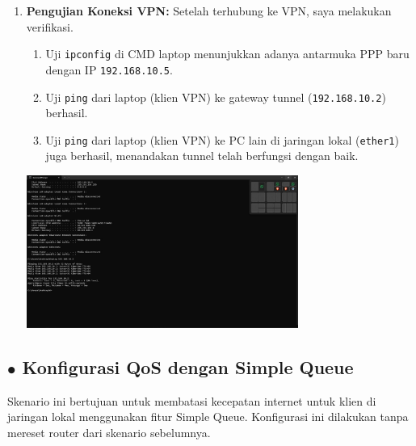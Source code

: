 \begin{enumerate}
    \item \textbf{Pengujian Koneksi VPN:} Setelah terhubung ke VPN, saya melakukan verifikasi.
    \begin{enumerate}[label*=\alph*.]
        \item Uji \texttt{ipconfig} di CMD laptop menunjukkan adanya antarmuka PPP baru dengan IP \texttt{192.168.10.5}.
        \item Uji \texttt{ping} dari laptop (klien VPN) ke gateway tunnel (\texttt{192.168.10.2}) berhasil.
        \item Uji \texttt{ping} dari laptop (klien VPN) ke PC lain di jaringan lokal (\texttt{ether1}) juga berhasil, menandakan tunnel telah berfungsi dengan baik.
    \end{enumerate}
    \begin{center}
        \includegraphics[width=0.7\textwidth]{img5/VPNTestping.jpeg} 
    \end{center}
\end{enumerate}

\subsection*{$\bullet$ Konfigurasi QoS dengan Simple Queue}
Skenario ini bertujuan untuk membatasi kecepatan internet untuk klien di jaringan lokal menggunakan fitur Simple Queue. Konfigurasi ini dilakukan tanpa mereset router dari skenario sebelumnya.

